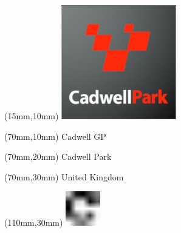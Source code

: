 \null\newpage
\begin{textblock*}{50mm}(15mm,10mm)%
\includegraphics[width=50mm]{LG/2015-05-20_00076.png}
\end{textblock*}
\begin{textblock*}{130mm}(70mm,10mm)%
{\fontsize{20}{20}\selectfont Cadwell GP}\\
\end{textblock*}
\begin{textblock*}{120mm}(70mm,20mm)%
{\fontsize{16}{16}\selectfont Cadwell Park}\\
\end{textblock*}
\begin{textblock*}{120mm}(70mm,30mm)%
{\fontsize{12}{12}\selectfont United Kingdom}
\end{textblock*}
\begin{textblock*}{30mm}(110mm,30mm)%
\centering
\includegraphics[height=15mm]{icons/fa-rotate-right.pdf}
\end{textblock*}
